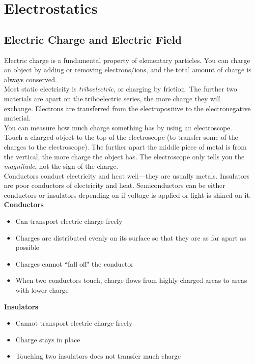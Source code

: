 \documentclass[class=article, crop=false]{standalone}
\begin{document}
  \section{Electrostatics}
  \subsection{Electric Charge and Electric Field}
  Electric charge is a fundamental property of elementary particles. You can charge an object by adding or removing electrons/ions, and the total amount of charge is always conserved. \\[10pt]
  Most static electricity is \emph{triboelectric}, or charging by friction. The further two materials are apart on the triboelectric series, the more charge they will exchange. Electrons are transferred from the electropositive to the electronegative material. \\[10pt]
  You can measure how much charge something has by using an electroscope. Touch a charged object to the top of the electroscope (to transfer some of the charges to the electroscope). The further apart the middle piece of metal is from the vertical, the more charge the object has. The electroscope only tells you the \emph{magnitude}, not the sign of the charge. \\[10pt]
  Conductors conduct electricity and heat well---they are usually metals. Insulators are poor conductors of electricity and heat. Semiconductors can be either conductors or insulators depending on if voltage is applied or light is shined on it. \\[10pt]
  \textbf{Conductors}
  \begin{itemize}
    \item Can transport electric charge freely
    \item Charges are distributed evenly on its surface so that they are as far apart as possible
    \item Charges cannot ``fall off" the conductor
    \item When two conductors touch, charge flows from highly charged areas to areas with lower charge
  \end{itemize}
  \textbf{Insulators}
  \begin{itemize}
    \item Cannot transport electric charge freely
    \item Charge stays in place
    \item Touching two insulators does not transfer much charge
  \end{itemize}
\end{document}
